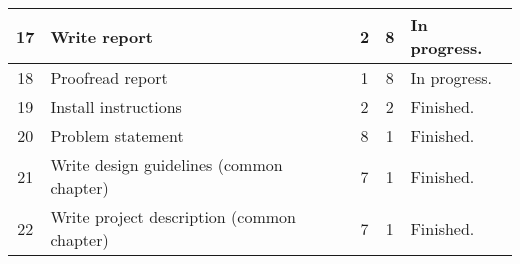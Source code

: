 \begin{center}
\begin{tabular}{| c | p{4cm} | c | c | l |}
	17	& Write report								& 2 		& 8 				& In progress. 		\\	\hline
	18	& Proofread report 							& 1 		& 8 				& In progress. 		\\ 	\hline
	19	& Install instructions 						& 2 		& 2 				& Finished. 		\\	\hline
	20	& Problem statement							& 8 		& 1 				& Finished. 		\\	\hline
	21	& Write	design guidelines (common chapter)	& 7 		& 1 				& Finished. 		\\ 	\hline
	22	& Write	project description (common chapter)& 7 		& 1 				& Finished. 		\\ 	\hline
	\end{tabular}
\end{center}
